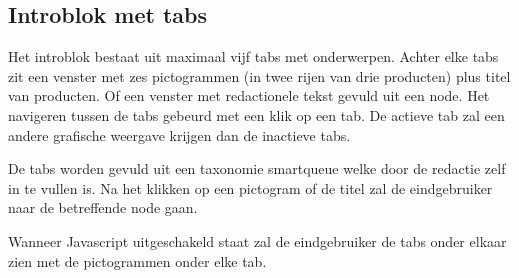 \subsection{Introblok met tabs}
\label{sec:introbloktabs}
Het introblok bestaat uit maximaal vijf tabs met onderwerpen. Achter elke tabs zit een venster met zes pictogrammen (in twee rijen van drie producten) plus titel van producten. Of een venster met redactionele tekst gevuld uit een node. Het navigeren tussen de tabs gebeurd met een klik op een tab. De actieve tab zal een andere grafische weergave krijgen dan de inactieve tabs.

De tabs worden gevuld uit een taxonomie smartqueue welke door de redactie zelf in te vullen is. Na het klikken op een pictogram of de titel zal de eindgebruiker naar de betreffende node gaan.

Wanneer Javascript uitgeschakeld staat zal de eindgebruiker de tabs onder elkaar zien met de pictogrammen onder elke tab.